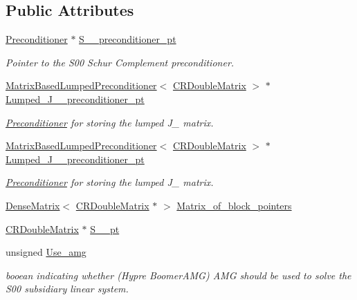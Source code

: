 \subsection*{Public Attributes}
\begin{DoxyCompactItemize}
\item 
\hyperlink{classoomph_1_1Preconditioner}{Preconditioner} $\ast$ \hyperlink{classoomph_1_1InexactSubBiharmonicPreconditioner_a0ebc16dae9af3e7aa032ebe5b4cc12a3}{S\+\_\+\_\+preconditioner\+\_\+pt}
\begin{DoxyCompactList}\small\item\em Pointer to the S00 Schur Complement preconditioner. \end{DoxyCompactList}\item 
\hyperlink{classoomph_1_1MatrixBasedLumpedPreconditioner}{Matrix\+Based\+Lumped\+Preconditioner}$<$ \hyperlink{classoomph_1_1CRDoubleMatrix}{C\+R\+Double\+Matrix} $>$ $\ast$ \hyperlink{classoomph_1_1InexactSubBiharmonicPreconditioner_af45a4741b2579943ea9c39190c86b85b}{Lumped\+\_\+\+J\+\_\+\_\+preconditioner\+\_\+pt}
\begin{DoxyCompactList}\small\item\em \hyperlink{classoomph_1_1Preconditioner}{Preconditioner} for storing the lumped J\+\_ matrix. \end{DoxyCompactList}\item 
\hyperlink{classoomph_1_1MatrixBasedLumpedPreconditioner}{Matrix\+Based\+Lumped\+Preconditioner}$<$ \hyperlink{classoomph_1_1CRDoubleMatrix}{C\+R\+Double\+Matrix} $>$ $\ast$ \hyperlink{classoomph_1_1InexactSubBiharmonicPreconditioner_aad7004d5c092f9f196caecceb3d68a04}{Lumped\+\_\+\+J\+\_\+\_\+preconditioner\+\_\+pt}
\begin{DoxyCompactList}\small\item\em \hyperlink{classoomph_1_1Preconditioner}{Preconditioner} for storing the lumped J\+\_ matrix. \end{DoxyCompactList}\item 
\hyperlink{classoomph_1_1DenseMatrix}{Dense\+Matrix}$<$ \hyperlink{classoomph_1_1CRDoubleMatrix}{C\+R\+Double\+Matrix} $\ast$ $>$ \hyperlink{classoomph_1_1InexactSubBiharmonicPreconditioner_a016b56f4fcbc65db776174167f2a0111}{Matrix\+\_\+of\+\_\+block\+\_\+pointers}
\item 
\hyperlink{classoomph_1_1CRDoubleMatrix}{C\+R\+Double\+Matrix} $\ast$ \hyperlink{classoomph_1_1InexactSubBiharmonicPreconditioner_ad9c783c3402ddaab0a56b9efcf7a8ec3}{S\+\_\+\_\+pt}
\item 
unsigned \hyperlink{classoomph_1_1InexactSubBiharmonicPreconditioner_a31f83c027a5423b221a12f5b86649394}{Use\+\_\+amg}
\begin{DoxyCompactList}\small\item\em booean indicating whether (Hypre Boomer\+A\+MG) A\+MG should be used to solve the S00 subsidiary linear system. \end{DoxyCompactList}\end{DoxyCompactItemize}
